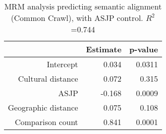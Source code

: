 \begin{table}[ht]
\centering
\begin{tabular}{rrr}
  \hline
 & Estimate & p-value \\ 
  \hline
Intercept & 0.034 & 0.0311 \\ 
  Cultural distance & 0.072 & 0.315 \\ 
  ASJP & -0.168 & 0.0009 \\ 
  Geographic distance & 0.075 & 0.108 \\ 
  Comparison count & 0.841 & 0.0001 \\ 
   \hline
\end{tabular}
\caption{MRM analysis predicting semantic alignment (Common Crawl), with ASJP control. $R^2$=0.744} 
\end{table}
